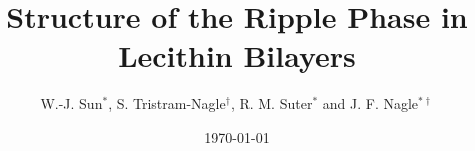 

\draft
\title{Structure of the Ripple Phase in Lecithin Bilayers}

\author{W.-J. Sun$^{*}$, S. Tristram-Nagle$^{\dag}$, R. M. Suter$^{*}$ and J. F.
 Nagle$^{* \dag}$}
\address{Department of Physics$^{*}$ and Department of Biological 
Sciences$^{\dag}$,
\protect\\ Carnegie Mellon University , Pittsburgh, PA 15213 \\
{\rm (Submitted to PNAS)}}

\date{\today}
\maketitle
